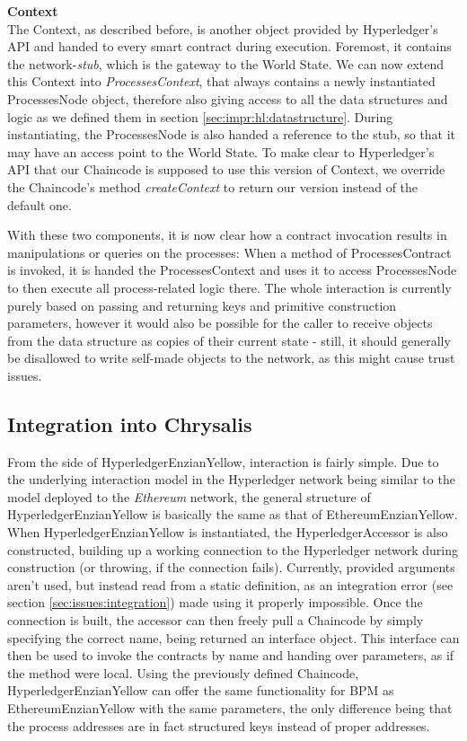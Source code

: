 \textbf{Context} \\[0.2em]
The Context, as described before, is another object provided by Hyperledger's API and handed to every smart contract during execution. Foremost, it contains the network-\emph{stub}, which is the gateway to the World State. We can now extend this Context into \emph{ProcessesContext}, that always contains a newly instantiated ProcessesNode object, therefore also giving access to all the data structures and logic as we defined them in section \ref{sec:impr:hl:datastructure}. During instantiating, the ProcessesNode is also handed a reference to the stub, so that it may have an access point to the World State. To make clear to Hyperledger's API that our Chaincode is supposed to use this version of Context, we override the Chaincode's method \emph{createContext} to return our version instead of the default one. 

With these two components, it is now clear how a contract invocation results in manipulations or queries on the processes: When a method of ProcessesContract is invoked, it is handed the ProcessesContext and uses it to access ProcessesNode to then execute all process-related logic there. The whole interaction is currently purely based on passing and returning keys and primitive construction parameters, however it would also be possible for the caller to receive objects from the data structure as copies of their current state - still, it should generally be disallowed to write self-made objects to the network, as this might cause trust issues.

\subsection{Integration into Chrysalis}
\label{sec:impr:hl:integration}

From the side of HyperledgerEnzianYellow, interaction is fairly simple. Due to the underlying interaction model in the Hyperledger network being similar to the model deployed to the \emph{Ethereum} network, the general structure of HyperledgerEnzianYellow is basically the same as that of EthereumEnzianYellow. \newline
When HyperledgerEnzianYellow is instantiated, the HyperledgerAccessor is also constructed, building up a working connection to the Hyperledger network during construction (or throwing, if the connection fails). Currently, provided arguments aren't used, but instead read from a static definition, as an integration error (see section \ref{sec:issues:integration}) made using it properly impossible. \newline
Once the connection is built, the accessor can then freely pull a Chaincode by simply specifying the correct name, being returned an interface object. This interface can then be used to invoke the contracts by name and handing over parameters, as if the method were local. Using the previously defined Chaincode, HyperledgerEnzianYellow can offer the same functionality for BPM as EthereumEnzianYellow with the same parameters, the only difference being that the process addresses are in fact structured keys instead of proper addresses.

